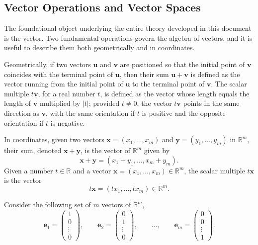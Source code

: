 \subsection{Vector Operations and Vector Spaces}

The foundational object underlying the entire theory developed in this document is the vector. Two fundamental operations govern the algebra of vectors, and it is useful to describe them both geometrically and in coordinates.

Geometrically, if two vectors $\mathbf{u}$ and $\mathbf{v}$ are positioned so that the initial point of $\mathbf{v}$ coincides with the terminal point of $\mathbf{u}$, then their sum $\mathbf{u} + \mathbf{v}$ is defined as the vector running from the initial point of $\mathbf{u}$ to the terminal point of $\mathbf{v}$. The scalar multiple $t\mathbf{v}$, for a real number $t$, is defined as the vector whose length equals the length of $\mathbf{v}$ multiplied by $|t|$; provided $t \neq 0$, the vector $t\mathbf{v}$ points in the same direction as $\mathbf{v}$, with the same orientation if $t$ is positive and the opposite orientation if $t$ is negative.

In coordinates, given two vectors $\mathbf{x} = (x_1, \dots, x_m)$ and $\mathbf{y} = (y_1, \dots, y_m)$ in $\mathbb{R}^m$, their sum, denoted $\mathbf{x}+\mathbf{y}$, is the vector of $\mathbb{R}^m$ given by
\[
\mathbf{x} + \mathbf{y} = (x_1+y_1, \dots, x_m+y_m).
\]
Given a number $t \in \mathbb{R}$ and a vector $\mathbf{x} = (x_1, \dots, x_m) \in \mathbb{R}^m$, the scalar multiple $t\mathbf{x}$ is the vector
\[
t\mathbf{x} = (t x_1, \dots, t x_m) \in \mathbb{R}^m.
\]

Consider the following set of $m$ vectors of $\mathbb{R}^m$,
\[
\mathbf{e}_1 = \begin{pmatrix} 1 \\ 0 \\ \vdots \\ 0 \end{pmatrix}, \qquad \mathbf{e}_2 = \begin{pmatrix} 0 \\ 1 \\ \vdots \\ 0 \end{pmatrix}, \qquad \ldots, \qquad \mathbf{e}_m = \begin{pmatrix} 0 \\ 0 \\ \vdots \\ 1 \end{pmatrix}.
\]

